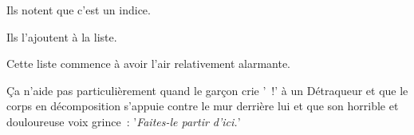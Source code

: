 Ils notent que c'est un indice.

Ils l'ajoutent à la liste.

Cette liste commence à avoir l'air relativement alarmante.

Ça n'aide pas particulièrement quand le garçon crie '~!' à un Détraqueur et que le corps en décomposition s'appuie contre le mur derrière lui et que son horrible et douloureuse voix grince~: '\emph{Faites-le partir d'ici.}'
